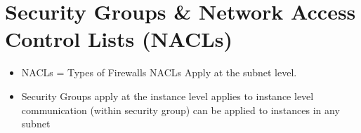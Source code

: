 \documentclass[11pt]{article}
\begin{document}
    \section[NACLs]{Security Groups \& Network Access Control Lists (NACLs)}
    \begin{itemize}
        \item NACLs = Types of Firewalls
        \subitem NACLs Apply at the subnet level.
        \item Security Groups apply at the instance level
        \subitem applies to instance level communication (within security group)
        \subitem can be applied to instances in any subnet
    \end{itemize}
\end{document}
